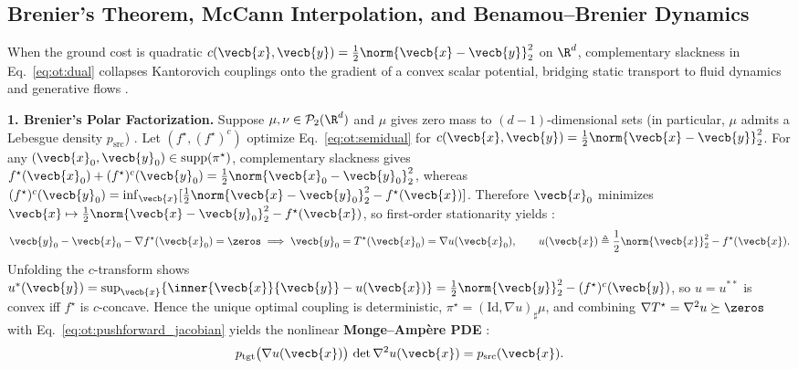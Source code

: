 \documentclass[../../../../master.tex]{subfiles}
\begin{document}
\subsection{Brenier's Theorem, McCann Interpolation, and Benamou--Brenier Dynamics}
\label{sec:ot:brenier_dynamic}

When the ground cost is quadratic $c(\vecb{x}, \vecb{y}) = \frac{1}{2}\norm{\vecb{x} - \vecb{y}}_2^2$ on $\R^d$, complementary slackness in Eq.~\eqref{eq:ot:dual} collapses Kantorovich couplings onto the gradient of a convex scalar potential, bridging static transport to fluid dynamics and generative flows  .

\begin{coremath}
\label{cm:ot:brenier_bb}
\textbf{1. Brenier's Polar Factorization.} Suppose $\mu, \nu \in \mathcal{P}_2(\R^d)$ and $\mu$ gives zero mass to $(d-1)$-dimensional sets (in particular, $\mu$ admits a Lebesgue density $p_{\mathrm{src}}$) . Let $(f^\star, (f^\star)^c)$ optimize Eq.~\eqref{eq:ot:semidual} for $c(\vecb{x},\vecb{y}) = \frac{1}{2}\norm{\vecb{x}-\vecb{y}}_2^2$. For any $(\vecb{x}_0, \vecb{y}_0) \in \mathrm{supp}(\pi^\star)$, complementary slackness gives $f^\star(\vecb{x}_0) + (f^\star)^c(\vecb{y}_0) = \frac{1}{2}\norm{\vecb{x}_0 - \vecb{y}_0}_2^2$, whereas $(f^\star)^c(\vecb{y}_0) = \inf_{\vecb{x}} [\frac{1}{2}\norm{\vecb{x} - \vecb{y}_0}_2^2 - f^\star(\vecb{x})]$. Therefore $\vecb{x}_0$ minimizes $\vecb{x} \mapsto \frac{1}{2}\norm{\vecb{x}-\vecb{y}_0}_2^2 - f^\star(\vecb{x})$, so first-order stationarity yields :
\begin{equation}
\label{eq:ot:brenier_grad}
  \vecb{y}_0 - \vecb{x}_0 - \nabla f^\star(\vecb{x}_0) = \zeros \implies
  \vecb{y}_0 = T^\star(\vecb{x}_0) = \nabla u(\vecb{x}_0), \qquad
  u(\vecb{x}) \triangleq \frac{1}{2}\norm{\vecb{x}}_2^2 - f^\star(\vecb{x}).
\end{equation}
Unfolding the $c$-transform shows $u^\ast(\vecb{y}) = \sup_{\vecb{x}} \{\inner{\vecb{x}}{\vecb{y}} - u(\vecb{x})\} = \frac{1}{2}\norm{\vecb{y}}_2^2 - (f^\star)^c(\vecb{y})$, so $u = u^{\ast\ast}$ is convex iff $f^\star$ is $c$-concave. Hence the unique optimal coupling is deterministic, $\pi^\star = (\mathrm{Id}, \nabla u)_\sharp \mu$, and combining $\nabla T^\star = \nabla^2 u \succeq \zeros$ with Eq.~\eqref{eq:ot:pushforward_jacobian} yields the nonlinear \textbf{Monge--Amp\`ere PDE} :
\begin{equation}
\label{eq:ot:monge_ampere}
  p_{\mathrm{tgt}}\bigl(\nabla u(\vecb{x})\bigr)\,\det\nabla^2 u(\vecb{x}) = p_{\mathrm{src}}(\vecb{x}).
\end{equation}


\end{coremath}
\end{document}
